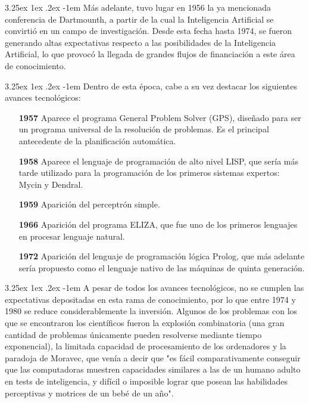\documentclass{article}
\makeatletter
\renewcommand\paragraph{\@startsection{paragraph}{5}{\z@}%
  {3.25ex \@plus1ex \@minus.2ex}%
  {-1em}%
  {\normalfont\normalsize\bfseries}}
\makeatother
\begin{document}
\paragraph{}
Más adelante, tuvo lugar en 1956 la ya mencionada conferencia de Dartmounth, a partir de la cual la Inteligencia Artificial se convirtió en un campo de investigación. Desde esta fecha hasta 1974, se fueron generando altas expectativas respecto a las posibilidades de la Inteligencia Artificial, lo que provocó la llegada de grandes flujos de financiación a este área de conocimiento.

\paragraph{}
Dentro de esta época, cabe a su vez destacar los siguientes avances tecnológicos:
\begin{itemize}
    \item[\textbf{1957}] Aparece el programa General Problem Solver (GPS)\cite{gps}, diseñado para ser un programa universal de la resolución de problemas. Es el principal antecedente de la planificación automática.
    \item[\textbf{1958}] Aparece el lenguaje de programación de alto nivel LISP\cite{lisp}, que sería más tarde utilizado para la programación de los primeros sistemas expertos: Mycin\cite{Mycin} y Dendral\cite{dendral}.
    \item[\textbf{1959}] Aparición del perceptrón simple\cite{perceptron}.
    \item[\textbf{1966}] Aparición del programa ELIZA\cite{eliza}, que fue uno de los primeros lenguajes en procesar lenguaje natural.
    \item[\textbf{1972}] Aparición del lenguaje de programación lógica Prolog\cite{prolog}, que más adelante sería propuesto como el lenguaje nativo de las máquinas de quinta generación\cite{prolog5a}. 
\end{itemize}

\paragraph{}
A pesar de todos los avances tecnológicos, no se cumplen las expectativas depositadas en esta rama de conocimiento, por lo que entre 1974 y 1980 se reduce considerablemente la inversión. Algunos de los problemas con los que se encontraron los científicos fueron la explosión combinatoria (una gran cantidad de problemas únicamente pueden resolverse mediante tiempo exponencial), la limitada capacidad de procesamiento de los ordenadores y la paradoja de Moravec, que venía a decir que "es fácil comparativamente conseguir que las computadoras muestren capacidades similares a las de un humano adulto en tests de inteligencia, y difícil o imposible lograr que posean las habilidades perceptivas y motrices de un bebé de un año"\cite{moravec}.
\end{document}
